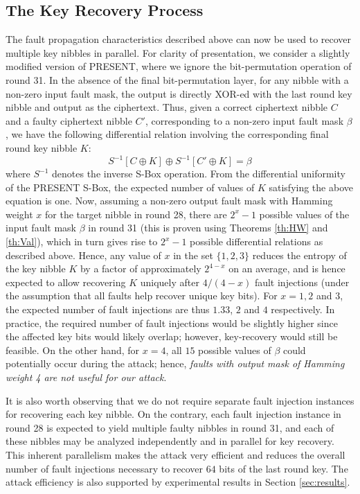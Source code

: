 \documentclass[10pt, conference, compsocconf]{IEEEtran}  %
\numberwithin{Definition}{section}
\numberwithin{Claim}{section}
\begin{document}
\subsection{The Key Recovery Process}
\label{subsec:key-recovery}

The fault propagation characteristics described above can now be used to recover multiple key nibbles in parallel. For clarity of presentation, we consider a slightly modified version of PRESENT, where we ignore the bit-permutation operation of round 31. In the absence of the final bit-permutation layer, for any nibble with a non-zero input fault mask, the output is directly XOR-ed with the last round key nibble and output as the ciphertext. Thus, given a correct ciphertext nibble $C$ and a faulty ciphertext nibble $C'$, corresponding to a non-zero input fault mask $\beta$, we have the following differential relation involving the corresponding final round key nibble $K$:
\begin{equation}
S^{-1}\left[C\oplus K\right] \oplus S^{-1}\left[C'\oplus K\right] = \beta\nonumber
\end{equation}
\noindent where $S^{-1}$ denotes the inverse S-Box operation. From the differential uniformity of the PRESENT S-Box, the expected number of values of $K$ satisfying the above equation is one. Now, assuming a non-zero output fault mask with Hamming weight $x$ for the target nibble in round 28, there are $2^x-1$ possible values of the input fault mask $\beta$ in round 31 (this is proven using Theorems \ref{th:HW} and \ref{th:Val}), which in turn gives rise to $2^x-1$ possible differential relations as described above. Hence, any value of $x$ in the set $\{1,2,3\}$ reduces the entropy of the key nibble $K$ by a factor of approximately $2^{4-x}$ on an average, and is hence expected to allow recovering $K$ uniquely after $4/(4-x)$ fault injections (under the assumption that all faults help recover unique key bits). For $x=1,2$ and $3$, the expected number of fault injections are thus $1.33$, $2$ and $4$ respectively. In practice, the required number of fault injections would be slightly higher since the affected key bits would likely overlap; however, key-recovery would still be feasible. On the other hand, for $x=4$, all $15$ possible values of $\beta$ could potentially occur during the attack; hence, \emph{faults with output mask of Hamming weight 4 are not useful for our attack}. 

It is also worth observing that we do not require separate fault injection instances for recovering each key nibble. On the contrary, each fault injection instance in round 28 is expected to yield multiple faulty nibbles in round 31, and each of these nibbles may be analyzed independently and in parallel for key recovery. This inherent parallelism makes the attack very efficient and reduces the overall number of fault injections necessary to recover $64$ bits of the last round key. The attack efficiency is also supported by experimental results in Section \ref{sec:results}. 
\end{document}
